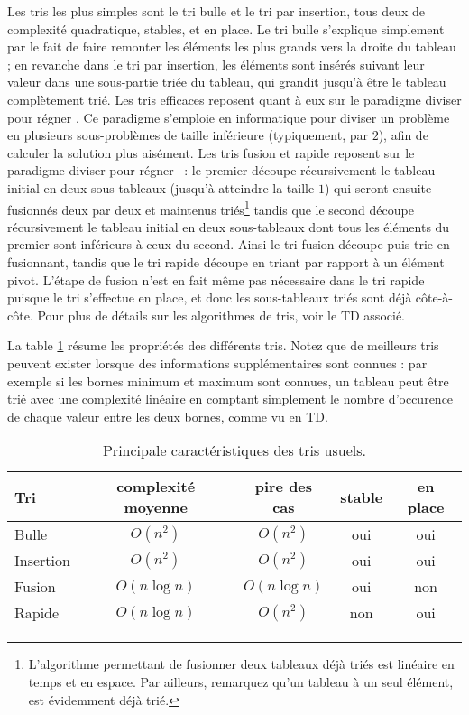 \documentclass[10pt]{article}
\begin{document}
Les tris les plus simples sont le tri bulle et le tri par
insertion, tous deux de complexité quadratique, stables, et en place. Le tri bulle s'explique simplement par le fait
de faire remonter les éléments les plus grands vers la droite du tableau ; en revanche dans le tri par insertion, les
éléments sont insérés suivant leur valeur dans une sous-partie triée du tableau, qui grandit jusqu'à être le tableau
complètement trié. Les tris efficaces reposent quant à eux sur le paradigme \og diviser pour régner \fg.
Ce paradigme s'emploie en informatique pour diviser un problème en plusieurs sous-problèmes de taille inférieure
(typiquement, par $2$), afin de calculer la solution plus aisément. Les tris fusion et rapide reposent 
sur le paradigme \og diviser pour régner \fg~: le premier découpe récursivement le tableau initial en deux sous-tableaux (jusqu'à atteindre la taille $1$)
qui seront ensuite fusionnés deux par deux et maintenus triés\footnote{L'algorithme permettant de fusionner deux tableaux
  déjà triés est linéaire en temps et en espace. Par ailleurs, remarquez qu'un tableau à un seul élément, est évidemment déjà trié.}
tandis que le second découpe récursivement le tableau initial en deux sous-tableaux dont tous les éléments du premier sont inférieurs
à ceux du second. Ainsi le tri fusion découpe puis trie en fusionnant, tandis que le tri rapide
découpe en triant par rapport à un élément pivot. L'étape de fusion n'est en fait même pas nécessaire dans le tri rapide
puisque le tri s'effectue en place, et donc les sous-tableaux triés sont déjà côte-à-côte. Pour plus de détails sur les
algorithmes de tris, voir le TD associé.

La table \ref{tab.tris} résume les propriétés des différents tris. Notez que de meilleurs tris peuvent exister lorsque des
informations supplémentaires sont connues : par exemple si les bornes minimum et maximum sont connues, un tableau
peut être trié avec une complexité linéaire en comptant simplement le nombre d'occurence de chaque valeur entre les
deux bornes, comme vu en TD.

\begin{table}[h!]
  \centering
\begin{tabular}{|l|c|c|c|c|}
  \hline
  Tri & complexité moyenne & pire des cas & stable & en place \\
  \hline
  \hline
  Bulle & $O(n^2)$ & $O(n^2)$ & oui & oui\\
  \hline
  Insertion & $O(n^2)$ & $O(n^2)$ & oui & oui\\
  \hline
  Fusion & $O(n \log n)$ & $O(n \log n)$ & oui & non\\
  \hline  
  Rapide & $O(n \log n)$ & $O(n^2)$ & non & oui\\
  \hline  
\end{tabular}
\caption{Principale caractéristiques des tris usuels.
   \label{tab.tris}}
\end{table}
\end{document}
